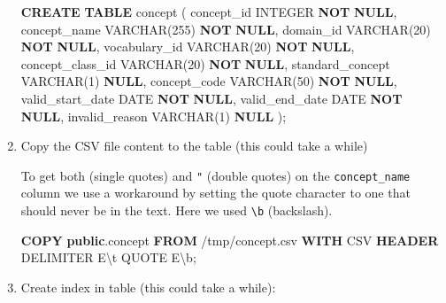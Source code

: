 \documentclass[
]{book}
\newenvironment{Shaded}{\begin{snugshade}}{\end{snugshade}}
\newcommand{\CharTok}[1]{\textcolor[rgb]{0.31,0.60,0.02}{#1}}
\newcommand{\DataTypeTok}[1]{\textcolor[rgb]{0.13,0.29,0.53}{#1}}
\newcommand{\DecValTok}[1]{\textcolor[rgb]{0.00,0.00,0.81}{#1}}
\newcommand{\KeywordTok}[1]{\textcolor[rgb]{0.13,0.29,0.53}{\textbf{#1}}}
\newcommand{\NormalTok}[1]{#1}
\newcommand{\StringTok}[1]{\textcolor[rgb]{0.31,0.60,0.02}{#1}}
\begin{document}
\begin{enumerate}
\begin{Shaded}
\begin{Highlighting}[]
\KeywordTok{CREATE} \KeywordTok{TABLE}\NormalTok{ concept (}
\NormalTok{  concept\_id         }\DataTypeTok{INTEGER}        \KeywordTok{NOT} \KeywordTok{NULL}\NormalTok{,}
\NormalTok{  concept\_name       }\DataTypeTok{VARCHAR}\NormalTok{(}\DecValTok{255}\NormalTok{)   }\KeywordTok{NOT} \KeywordTok{NULL}\NormalTok{,}
\NormalTok{  domain\_id          }\DataTypeTok{VARCHAR}\NormalTok{(}\DecValTok{20}\NormalTok{)    }\KeywordTok{NOT} \KeywordTok{NULL}\NormalTok{,}
\NormalTok{  vocabulary\_id      }\DataTypeTok{VARCHAR}\NormalTok{(}\DecValTok{20}\NormalTok{)    }\KeywordTok{NOT} \KeywordTok{NULL}\NormalTok{,}
\NormalTok{  concept\_class\_id   }\DataTypeTok{VARCHAR}\NormalTok{(}\DecValTok{20}\NormalTok{)    }\KeywordTok{NOT} \KeywordTok{NULL}\NormalTok{,}
\NormalTok{  standard\_concept   }\DataTypeTok{VARCHAR}\NormalTok{(}\DecValTok{1}\NormalTok{)     }\KeywordTok{NULL}\NormalTok{,}
\NormalTok{  concept\_code       }\DataTypeTok{VARCHAR}\NormalTok{(}\DecValTok{50}\NormalTok{)    }\KeywordTok{NOT} \KeywordTok{NULL}\NormalTok{,}
\NormalTok{  valid\_start\_date   }\DataTypeTok{DATE}           \KeywordTok{NOT} \KeywordTok{NULL}\NormalTok{,}
\NormalTok{  valid\_end\_date     }\DataTypeTok{DATE}           \KeywordTok{NOT} \KeywordTok{NULL}\NormalTok{,}
\NormalTok{  invalid\_reason     }\DataTypeTok{VARCHAR}\NormalTok{(}\DecValTok{1}\NormalTok{)     }\KeywordTok{NULL}
\NormalTok{);}
\end{Highlighting}
\end{Shaded}
\item
  Copy the CSV file content to the table (this could take a while)

  To get both \texttt{\textquotesingle{}} (single quotes) and \texttt{"} (double quotes) on the \texttt{concept\_name} column we use a workaround by setting the quote character to one that should never be in the text. Here we used \texttt{\textbackslash{}b} (backslash).

\begin{Shaded}
\begin{Highlighting}[]
\KeywordTok{COPY} \KeywordTok{public}\NormalTok{.concept }\KeywordTok{FROM} \StringTok{\textquotesingle{}/tmp/concept.csv\textquotesingle{}} \KeywordTok{WITH}\NormalTok{ CSV }\KeywordTok{HEADER}
\NormalTok{  DELIMITER E}\StringTok{\textquotesingle{}}\CharTok{\textbackslash{}t}\StringTok{\textquotesingle{}}\NormalTok{ QUOTE E}\StringTok{\textquotesingle{}}\CharTok{\textbackslash{}b}\StringTok{\textquotesingle{}}\NormalTok{;}
\end{Highlighting}
\end{Shaded}
\item
  Create index in table (this could take a while):


\end{enumerate}
\end{document}
